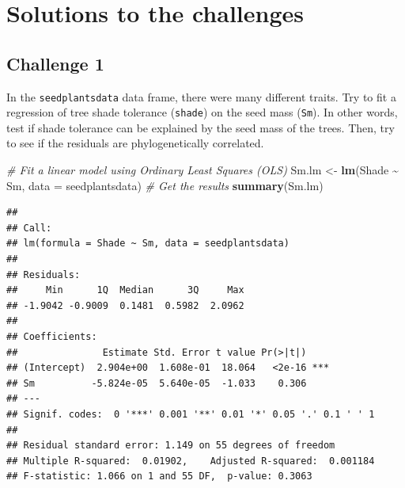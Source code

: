 \documentclass[
]{book}
\newenvironment{Shaded}{\begin{snugshade}}{\end{snugshade}}
\newcommand{\AttributeTok}[1]{\textcolor[rgb]{0.13,0.29,0.53}{#1}}
\newcommand{\CommentTok}[1]{\textcolor[rgb]{0.56,0.35,0.01}{\textit{#1}}}
\newcommand{\FunctionTok}[1]{\textcolor[rgb]{0.13,0.29,0.53}{\textbf{#1}}}
\newcommand{\NormalTok}[1]{#1}
\newcommand{\OtherTok}[1]{\textcolor[rgb]{0.56,0.35,0.01}{#1}}
\newcommand{\SpecialCharTok}[1]{\textcolor[rgb]{0.81,0.36,0.00}{\textbf{#1}}}
\begin{document}
\chapter{Solutions to the challenges}\label{solutions}

\section{Challenge 1}\label{challenge-1-1}

In the \texttt{seedplantsdata} data frame, there were many different traits. Try to fit a regression of tree shade tolerance (\texttt{shade}) on the seed mass (\texttt{Sm}). In other words, test if shade tolerance can be explained by the seed mass of the trees. Then, try to see if the residuals are phylogenetically correlated.

\begin{Shaded}
\begin{Highlighting}[]
\CommentTok{\# Fit a linear model using Ordinary Least Squares (OLS)}
\NormalTok{Sm.lm }\OtherTok{\textless{}{-}} \FunctionTok{lm}\NormalTok{(Shade }\SpecialCharTok{\textasciitilde{}}\NormalTok{ Sm, }\AttributeTok{data =}\NormalTok{ seedplantsdata)}
\CommentTok{\# Get the results}
\FunctionTok{summary}\NormalTok{(Sm.lm)}
\end{Highlighting}
\end{Shaded}

\begin{verbatim}
## 
## Call:
## lm(formula = Shade ~ Sm, data = seedplantsdata)
## 
## Residuals:
##     Min      1Q  Median      3Q     Max 
## -1.9042 -0.9009  0.1481  0.5982  2.0962 
## 
## Coefficients:
##               Estimate Std. Error t value Pr(>|t|)    
## (Intercept)  2.904e+00  1.608e-01  18.064   <2e-16 ***
## Sm          -5.824e-05  5.640e-05  -1.033    0.306    
## ---
## Signif. codes:  0 '***' 0.001 '**' 0.01 '*' 0.05 '.' 0.1 ' ' 1
## 
## Residual standard error: 1.149 on 55 degrees of freedom
## Multiple R-squared:  0.01902,    Adjusted R-squared:  0.001184 
## F-statistic: 1.066 on 1 and 55 DF,  p-value: 0.3063
\end{verbatim}
\end{document}
